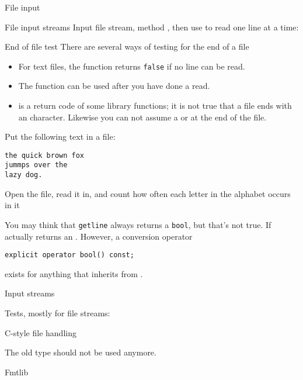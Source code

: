  {File input}

\begin{block}{File input streams}
  \label{sl:filein}
  Input file stream, method , then use
   to read one line at a time:
\end{block}

\begin{block}{End of file test}
  There are several ways of testing for the end of a file
  \begin{itemize}
  \item For text files, the  function returns
    \lstinline{false} if no line can be read.
  \item The  function can be used after you have done
    a read.
  \item {} is a return code of some library
    functions; it is not true that a file ends with an 
    character.
    Likewise you can not assume a
     or  at the end of the file.
  \end{itemize}
\end{block}

\begin{exercise}
  \label{ex:foxcount}
  Put the following text in a file:
\begin{verbatim}
the quick brown fox
jummps over the
lazy dog.
\end{verbatim}
  Open the file, read it in, and count how often each letter in the
  alphabet occurs in it
\end{exercise}

\begin{advanced}
  You may think that \lstinline{getline} always returns a \lstinline{bool}, but that's
  not true. If actually returns an . However, a conversion operator
\begin{verbatim}
explicit operator bool() const;
\end{verbatim}
  exists for anything that inherits from .
\end{advanced}

 {Input streams}

Tests, mostly for file streams:  

 {C-style file handling}

The old  type should not be used anymore.

 {Fmtlib}
\label{sec:fmtlib}

